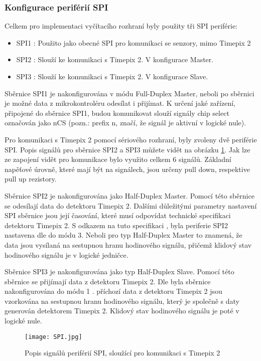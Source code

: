 	\subsubsection{Konfigurace periférií SPI}
	Celkem pro implementaci vyčítacího rozhraní byly použity tři SPI periférie:
	 \begin{itemize}
	 	\setlength\itemsep{0.005em}
	 	\item SPI1 : Použito jako obecné SPI pro komunikaci se senzory, mimo Timepix 2
	 	\item SPI2 : Slouží ke komunikaci s Timepix 2. V konfigurace Master. 
	 	\item SPI3 : Slouží ke komunikaci s Timepix 2. V konfigurace Slave.
	 \end{itemize}
 	Sběrnice SPI1 je nakonfigurována v módu Full-Duplex Master, neboli po sběrnici je možné data z mikrokontroléru odesílat i přijímat. K určení jaké zařízení, připojené do sběrnice SPI1, budou komunikovat slouží signály chip select označován jako nCS (pozn.: prefix n, značí, že signál je aktivní v logické nule). 
 	\par Pro komunikaci s Timepix 2 pomocí sériového rozhraní, byly zvoleny dvě periférie SPI. Popis signálů pro sběrnice SPI2 a SPI3 můžete vidět na obrázku \ref{fig:SPI}. Jak lze ze zapojení vidět pro komunikace bylo využito celkem 6 signálů. Základní napěťové úrovně, které mají být na signálech, jsou určeny pull down, respektive pull up rezistory. %
 	
 	\par Sběrnice SPI2 je nakonfigurována jako Half-Duplex Master. Pomocí této sběrnice se odesílají data do detektoru Timepix 2. Dalšími důležitými parametry nastavení SPI sběrnice jsou její časování, které musí odpovídat technické specifikaci detektoru Timepix 2. S odkazem na tuto specifikaci \cite{Timepix2}, byla periferie SPI2 nastavena dle \cite{SPI} do módu 3. Neboli pro typ Half-Duplex Master to znamená, že data jsou vysílaná na sestupnou hranu hodinového signálu, přičemž klidový stav hodinového signálu je v logické jedničce.
 	
 	\par Sběrnice SPI3 je nakonfigurována jako typ Half-Duplex Slave. Pomocí této sběrnice se přijímají data z detektoru Timepix 2. Dle \cite{Timepix2} byla sběrnice nakonfigurována do módu 1 \cite{SPI}. příchozí data z detektoru Timepix 2 jsou vzorkována na sestupnou hranu hodinového signálu, který je společně s daty generován detektorem Timepix 2. Klidový stav hodinového signálu je poté v logické nule.
	\begin{figure}[h!]
 		\centering
 		\captionsetup{justification=centering}
 		\texttt{[image: SPI.jpg]}
 		\caption{Popis signálů periférií SPI, sloužící pro komunikaci s Timepix 2} 
 		\label{fig:SPI}
 	\end{figure}
 	
